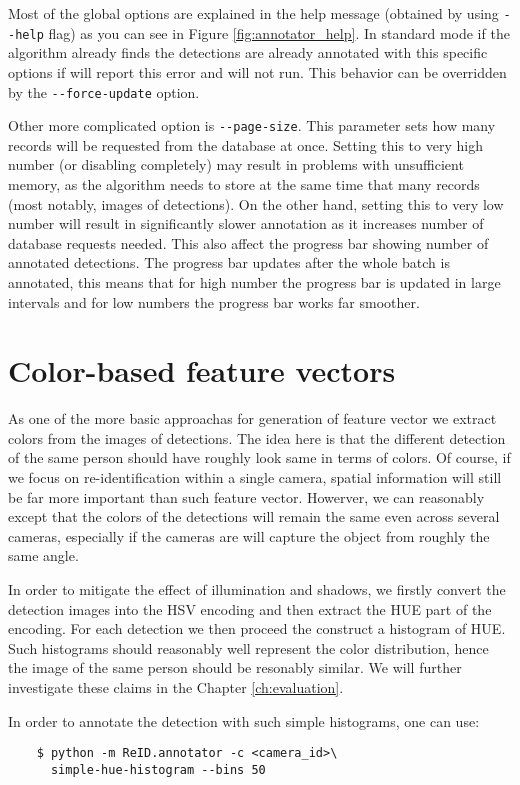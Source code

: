 Most of the global options are explained in the help message (obtained by using
\verb+--help+ flag) as you can see in Figure \ref{fig:annotator_help}. In standard
mode if the algorithm already finds the detections are already annotated with this
specific options if will report this error and will not run. This behavior can be
overridden by the \verb+--force-update+ option.

Other more complicated option is \verb+--page-size+. This parameter sets how many
records will be requested from the database at once. Setting this to very high number
(or disabling completely) may result in problems with unsufficient memory, as the 
algorithm needs to store at the same time that many records (most notably, images of 
detections). On the other hand, setting this to very low number will result in
significantly slower annotation as it increases number of database requests needed.
This also affect the progress bar showing number of annotated detections. The progress
bar updates after the whole batch is annotated, this means that for high number the
progress bar is updated in large intervals and for low numbers the progress bar works
far smoother.

\section{Color-based feature vectors}

As one of the more basic approachas for generation of feature vector we extract colors
from the images of detections. The idea here is that the different detection of the same
person should have roughly look same in terms of colors. Of course, if we focus on
re-identification within a single camera, spatial information will still be far more
important than such feature vector. Howerver, we can reasonably except that the colors
of the detections will remain the same even across several cameras, especially if the
cameras are will capture the object from roughly the same angle.

In order to mitigate the effect of illumination and shadows, we firstly convert the
detection images into the HSV encoding and then extract the HUE part of the encoding.
For each detection we then proceed the construct a histogram of HUE. Such histograms
should reasonably well represent the color distribution, hence the image of the same
person should be resonably similar. We will further investigate these claims in the 
Chapter \ref{ch:evaluation}.

In order to annotate the detection with such simple histograms, one can use:
\begin{verbatim}
    $ python -m ReID.annotator -c <camera_id>\
      simple-hue-histogram --bins 50
\end{verbatim}

